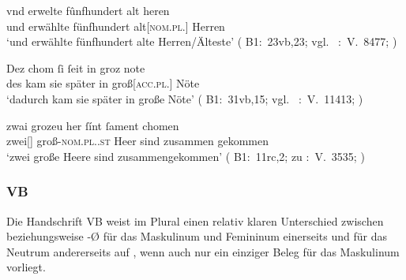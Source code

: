 \begin{exe}
\ex \label{ex:kcb1regel}
	\begin{xlist}
	\ex \label{ex:kcb1regel_1}
		\gll vnd erwelte fûnfhundert alt heren \\
			und erwählte fünfhundert alt[\textsc{nom.pl.\MascM}] Herren \\
		\trans `und erwählte fünfhundert alte Herren/Älteste'
			(%
				B1:~23vb,23; vgl.~%
				\KC:~V.~8477;
				\cite[237]{schroeder1895}%
			)

	\ex \label{ex:kcb1regel_2}
		\gll Dez chom ſi ſeit in groz note \\
			des kam sie später in groß[\textsc{acc.pl.\FemI}] Nöte \\
		\trans `dadurch kam sie später in große Nöte'
			(%
				B1:~31vb,15; vgl.~%
				\KC:~V.~11413;
				\cite[290]{schroeder1895}%
			)

	\ex \label{ex:kcb1regel_3}
		\gll zwai grozeu her ſínt ſament chomen \\
			zwei[\NeutI] groß-\textsc{nom.pl.\NeutI.st} Heer sind zusammen
				gekommen \\
		\trans `zwei große Heere sind zusammengekommen'
			(%
				B1:~11rc,2; zu
				\KC:~V.~3535;
				\cite[146]{schroeder1895}%
			)
	\end{xlist}
\end{exe}

\subsubsection{VB}
\label{par:adjvb}
Die Handschrift VB weist im Plural einen relativ klaren Unterschied
zwischen  beziehungsweise -Ø für das Maskulinum und Femininum
einerseits und  für das Neutrum andererseits auf ,
wenn auch nur ein einziger Beleg für das Maskulinum vorliegt.

